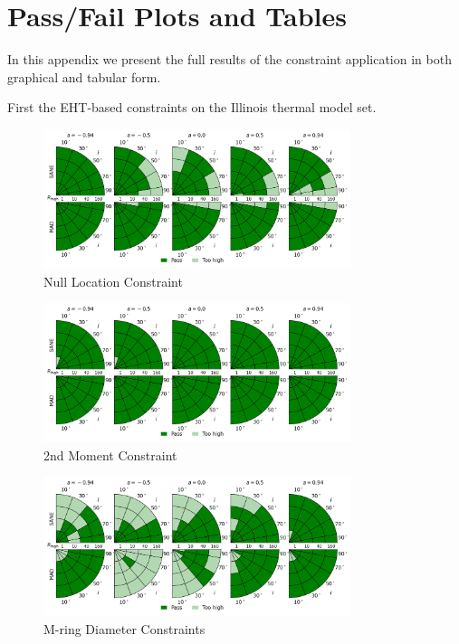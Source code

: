 \section{Pass/Fail Plots and Tables}\label{app:tables}


In this appendix we present the full results of the constraint application in both graphical and tabular form.

First the EHT-based constraints on the Illinois thermal model set.

\begin{figure}
  \centering
  \includegraphics[width=0.8\textwidth]{./figures/Null_loc_Constraints.png}
  \caption{Null Location Constraint}
  \label{fig:null_pizza}
\end{figure}
\begin{figure}
  \centering
  \includegraphics[width=0.8\textwidth]{./figures/230GHz_size_Constraints.png}
  \caption{2nd Moment Constraint}
  \label{fig:230GHz_size_pizza}
\end{figure}
\begin{figure}
  \centering
  \includegraphics[width=0.8\textwidth]{./figures/Mring_d_Constraints.png}
  \caption{M-ring Diameter Constraints}
  \label{fig:mring_diam_pizza}
\end{figure}
